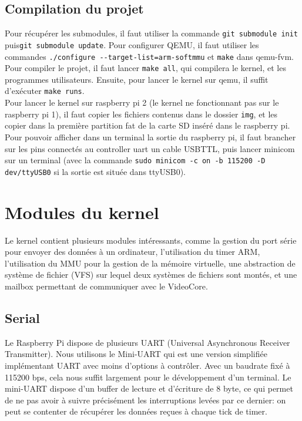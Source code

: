 \documentclass[a4paper]{article}
\begin{document}
\subsection{Compilation du projet}

Pour récupérer les submodules, il faut utiliser la commande \verb!git submodule init!
puis\verb!git submodule update!. Pour configurer QEMU, il faut utiliser les
commandes \verb!./configure --target-list=arm-softmmu! et \verb!make! dans qemu-fvm.\\

Pour compiler le projet, il faut lancer \verb!make all!, qui compilera le kernel,
et les programmes utilisateurs. Ensuite, pour lancer le kernel sur qemu, il
suffit d'exécuter \verb!make runs!.\\

Pour lancer le kernel sur raspberry pi 2 (le kernel ne fonctionnant pas sur le
raspberry pi 1), il faut copier les fichiers contenus
dans le dossier \verb!img!, et les copier dans la première partition fat de la
carte SD inséré dans le raspberry pi. Pour pouvoir afficher dans un terminal la
sortie du raspberry pi, il faut brancher sur les pins connectés au controller
uart un cable USBTTL, puis lancer minicom sur un terminal (avec la commande
\verb!sudo minicom -c on -b 115200 -D dev/ttyUSB0! si la sortie est située dans
ttyUSB0).


\section{Modules du kernel}
Le kernel contient plusieurs modules intéressants, comme la gestion du port série
pour envoyer des données à un ordinateur, l'utilisation du timer ARM,
l'utilisation du MMU pour la gestion de la mémoire virtuelle, une abstraction de
système de fichier (VFS) sur lequel deux systèmes de fichiers sont montés, et
une mailbox permettant de communiquer avec le VideoCore.

\subsection{Serial}
Le Raspberry Pi dispose de plusieurs UART (Universal Asynchronous Receiver Transmitter).
Nous utilisons le Mini-UART qui est une version simplifiée implémentant UART avec
moins d'options à contrôler. Avec un baudrate fixé à 115200 bps, cela nous suffit
largement pour le développement d'un terminal.
Le mini-UART dispose d'un buffer de lecture et d'écriture de 8 byte, ce qui permet
de ne pas avoir à suivre précisément les interruptions levées par ce dernier:
on peut se contenter de récupérer les données reçues à chaque tick de timer.
\end{document}
